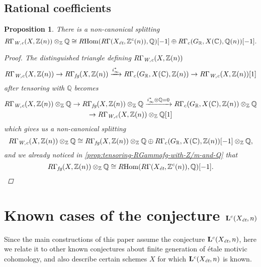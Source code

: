 \documentclass[leqno,12pt]{article}
\theoremstyle{plain}
\newtheorem{proposition}[theorem]{\indent\sc Proposition}
\theoremstyle{definition}
\DeclareMathOperator{\Hom}{Hom}
\newcommand{\ZZ}{\mathbb{Z}}
\newcommand{\QQ}{\mathbb{Q}}
\newcommand{\RR}{\mathbb{R}}
\newcommand{\CC}{\mathbb{C}}
\newcommand{\Wc}{\text{\it W,c}}
\newcommand{\et}{\text{\it \'{e}t}}
\newcommand{\fg}{\text{\it fg}}
\newcommand{\RHom}{R\!\Hom}
\begin{document}
\subsection*{Rational coefficients}

\begin{proposition}
  There is a non-canonical splitting
  \[ R\Gamma_\Wc (X, \ZZ(n)) \otimes_\ZZ \QQ \cong
    \RHom (R\Gamma (X_\et, \ZZ^c (n)), \QQ) [-1] \oplus
    R\Gamma_c (G_\RR, X (\CC), \QQ (n)) [-1]. \]

  \begin{proof}
    The distinguished triangle defining $R\Gamma_\Wc (X, \ZZ(n))$
    \[ R\Gamma_\Wc (X, \ZZ (n)) \to
      R\Gamma_\fg (X, \ZZ(n)) \xrightarrow{i_\infty^*}
      R\Gamma_c (G_\RR, X (\CC), \ZZ(n)) \to
      R\Gamma_\Wc (X, \ZZ (n)) [1] \]
    after tensoring with $\QQ$ becomes
    \begin{multline*}
      R\Gamma_\Wc (X, \ZZ (n))\otimes_\ZZ \QQ \to
      R\Gamma_\fg (X, \ZZ(n))\otimes_\ZZ \QQ \xrightarrow{i_\infty^*\otimes\QQ = 0}
      R\Gamma_c (G_\RR, X (\CC), \ZZ(n))\otimes_\ZZ \QQ \\
      \to R\Gamma_\Wc (X, \ZZ (n))\otimes_\ZZ \QQ [1]
    \end{multline*}
    which gives us a non-canonical splitting \cite[Chapitre~II,
    Corollaire~1.2.6]{Verdier-thesis}
    \[ R\Gamma_\Wc (X, \ZZ (n))\otimes_\ZZ \QQ \cong
      R\Gamma_\fg (X, \ZZ(n))\otimes_\ZZ \QQ \oplus
      R\Gamma_c (G_\RR, X (\CC), \ZZ(n)) [-1]\otimes_\ZZ \QQ, \]
    and we already noticed in \ref{prop:tensoring-RGammafg-with-Z/m-and-Q} that
    \[ R\Gamma_\fg (X, \ZZ (n)) \otimes_\ZZ \QQ \cong
      \RHom (R\Gamma (X_\et, \ZZ^c (n)), \QQ) [-1]. \qedhere \]
  \end{proof}
\end{proposition}


\section{Known cases of the conjecture $\mathbf{L}^c (X_\et,n)$}
\label{sec:known-cases-of-Lc-Xet-n}

Since the main constructions of this paper assume the conjecture
$\mathbf{L}^c (X_\et,n)$, here we relate it to other known conjectures about
finite generation of \'{e}tale motivic cohomology, and also describe certain schemes
$X$ for which $\mathbf{L}^c (X_\et,n)$ is known.
\end{document}
